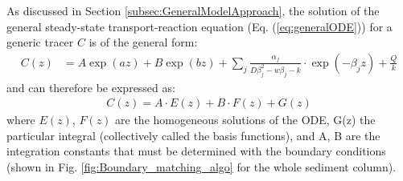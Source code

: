 \documentclass[gmd, manuscript]{copernicus}
\begin{document}
As discussed in Section \ref{subsec:GeneralModelApproach}, the solution of the general steady-state transport-reaction equation (Eq. (\ref{eq:generalODE})) for a generic 
tracer $C$ is of the general form:
\begin{align}
 C(z) &= A \exp(az) + B  \exp(bz) + \sum_j \frac{\alpha_j}{D \beta_j^2-w\beta_j-k}\cdot \exp(-\beta_j z) + \frac{Q}{k} \label{eq:ODE_general_solution}
\end{align}
and can therefore be expressed as:
\begin{align}
C(z) = A \cdot E(z) + B \cdot F(z) + G(z) 
\end{align}
where $E(z)$, $F (z)$ are the homogeneous solutions of the ODE, G(z) the particular integral (collectively called the basis functions), and A, B are the integration constants that must be determined with the boundary conditions 
(shown in Fig. \ref{fig:Boundary_matching_algo} for the whole sediment column).
\end{document}
